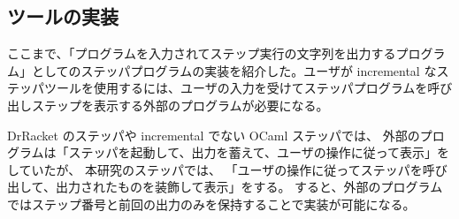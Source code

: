 \subsection{ツールの実装}

ここまで、「プログラムを入力されてステップ実行の文字列を出力するプログラム」としてのステッパプログラムの実装を紹介した。ユーザが incremental なステッパツールを使用するには、ユーザの入力を受けてステッパプログラムを呼び出しステップを表示する外部のプログラムが必要になる。

DrRacket のステッパ\cite{clements01}や incremental でない OCaml ステッパでは、
外部のプログラムは「ステッパを起動して、出力を蓄えて、ユーザの操作に従って表示」をしていたが、
本研究のステッパでは、
「ユーザの操作に従ってステッパを呼び出して、出力されたものを装飾して表示」をする。
すると、外部のプログラムではステップ番号と前回の出力のみを保持することで実装が可能になる。

